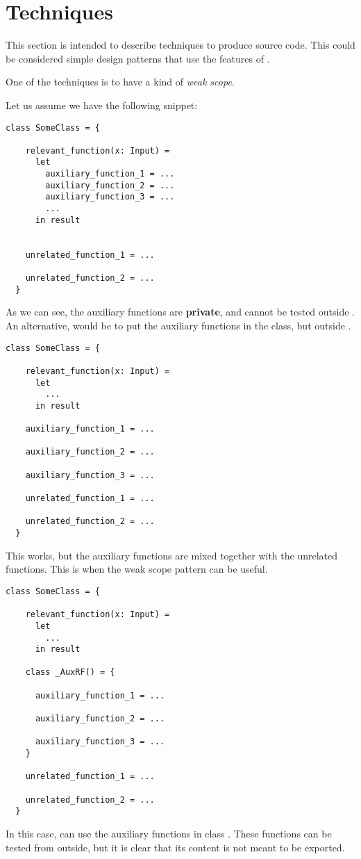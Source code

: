 \section{Techniques}

This section is intended to describe techniques to produce \Soda source code.
This could be considered simple design patterns that use the features of \Soda.

One of the techniques is to have a kind of \textit{weak scope}.

Let us assume we have the following snippet:
\begin{lstlisting}[label={lst:techniquesWeakScope0}]
  class SomeClass = {

    relevant_function(x: Input) =
      let
        auxiliary_function_1 = ...
        auxiliary_function_2 = ...
        auxiliary_function_3 = ...
        ...
      in result


    unrelated_function_1 = ...

    unrelated_function_2 = ...
  }
\end{lstlisting}

As we can see, the auxiliary functions are \textbf{private}, and cannot be tested outside .
An alternative, would be to put the auxiliary functions in the class, but outside .

\begin{lstlisting}[label={lst:techniquesWeakScope1}]
  class SomeClass = {

    relevant_function(x: Input) =
      let
        ...
      in result

    auxiliary_function_1 = ...

    auxiliary_function_2 = ...

    auxiliary_function_3 = ...

    unrelated_function_1 = ...

    unrelated_function_2 = ...
  }
\end{lstlisting}

This works, but the auxiliary functions are mixed together with the unrelated functions.
This is when the weak scope pattern can be useful.

\begin{lstlisting}[label={lst:techniquesWeakScope2}]
  class SomeClass = {

    relevant_function(x: Input) =
      let
        ...
      in result

    class _AuxRF() = {

      auxiliary_function_1 = ...

      auxiliary_function_2 = ...

      auxiliary_function_3 = ...
    }

    unrelated_function_1 = ...

    unrelated_function_2 = ...
  }
\end{lstlisting}

In this case,  can use the auxiliary functions in class .
These functions can be tested from outside, but it is clear that its content is not meant to be exported.

